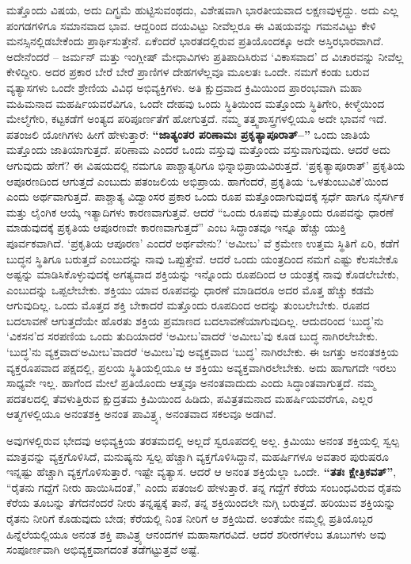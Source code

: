 ಮತ್ತೊಂದು ವಿಷಯ, ಅದು ದಿಗ್ಭ್ರಮೆ ಹುಟ್ಟಿಸುವಂಥದು, ವಿಶೇಷವಾಗಿ ಭಾರತೀಯವಾದ ಲಕ್ಷಣವುಳ್ಳದ್ದು. ಅದು ಎಲ್ಲ ಪಂಗಡಗಳಿಗೂ ಸಮಾನವಾದ ಭಾವ. ಆದ್ದರಿಂದ ದಯವಿಟ್ಟು ನೀವೆಲ್ಲರೂ ಈ ವಿಷಯವನ್ನು ಗಮನವಿಟ್ಟು ಕೇಳಿ ಮನಸ್ಸಿನಲ್ಲಿಡಬೇಕೆಂದು ಪ್ರಾರ್ಥಿಸುತ್ತೇನೆ. ಏಕೆಂದರೆ ಭಾರತದಲ್ಲಿರುವ ಪ್ರತಿಯೊಂದಕ್ಕೂ ಅದೇ ಅಸ್ತಿರಭಾರವಾಗಿದೆ. ಅದೇನೆಂದರೆ – ಜರ್ಮನ್​ ಮತ್ತು ಇಂಗ್ಲೀಷ್​ ಮೇಧಾವಿಗಳು ಪ್ರತಿಪಾದಿಸಿರುವ ‘ವಿಕಾಸವಾದ’ ದ ವಿಚಾರವನ್ನು ನೀವೆಲ್ಲ ಕೇಳಿದ್ದೀರಿ. ಅದರ ಪ್ರಕಾರ ಬೇರೆ ಬೇರೆ ಪ್ರಾಣಿಗಳ ದೇಹಗಳೆಲ್ಲವೂ ಮೂಲತಃ ಒಂದೇ. ನಮಗೆ ಕಂಡು ಬರುವ ವ್ಯತ್ಯಾಸಗಳು ಒಂದೇ ಶ್ರೇಣಿಯ ವಿವಿಧ ಅಭಿವ್ಯಕ್ತಿಗಳು. ಅತಿ ಕ್ಷುದ್ರವಾದ ಕ್ರಿಮಿಯಿಂದ ಪ್ರಾರಂಭವಾಗಿ ಮಹಾ ಮಹಿಮನಾದ ಮಹರ್ಷಿಯವರೆವಿಗೂ, ಒಂದೇ ದೇಹವು ಒಂದು ಸ್ಥಿತಿಯಿಂದ ಮತ್ತೊಂದು ಸ್ಥಿತಿಗೇರಿ, ಕೀಳ್ಮೆಯಿಂದ ಮೇಲ್ಮೆಗೇರಿ, ಕಟ್ಟಕಡೆಗೆ ಅಂತ್ಯದ ಪರಿಪೂರ್ಣತೆಗೆ ಹೋಗುತ್ತದೆ. ನಮ್ಮ ತತ್ತ್ವಶಾಸ್ತ್ರಗಳಲ್ಲಿಯೂ ಅದೇ ಭಾವನೆ ಇದೆ. ಪತಂಜಲಿ ಯೋಗಿಗಳು ಹೀಗೆ ಹೇಳುತ್ತಾರೆ: \textbf{“ಜಾತ್ಯಂತರ ಪರಿಣಾಮಃ ಪ್ರಕೃತ್ಯಾಪೂರಾತ್​–”} ಒಂದು ಜಾತಿಯೆ ಮತ್ತೊಂದು ಜಾತಿಯಾಗುತ್ತದೆ. ಪರಿಣಾಮ ಎಂದರೆ ಒಂದು ವಸ್ತುವು ಮತ್ತೊಂದು ವಸ್ತುವಾಗುವುದು. ಆದರೆ ಅದು ಆಗುವುದು ಹೇಗೆ? ಈ ವಿಷಯದಲ್ಲಿ ನಮಗೂ ಪಾಶ್ಚಾತ್ಯರಿಗೂ ಭಿನ್ನಾಭಿಪ್ರಾಯವಿರುತ್ತದೆ. ‘ಪ್ರಕೃತ್ಯಾಪೂರಾತ್​’ ಪ್ರಕೃತಿಯ ಆಪೂರಣದಿಂದ ಆಗುತ್ತದೆ ಎಂಬುದು ಪತಂಜಲಿಯ ಅಭಿಪ್ರಾಯ. ಹಾಗೆಂದರೆ, ಪ್ರಕೃತಿಯ ‘ಒಳತುಂಬುವಿಕೆ’ಯಿಂದ ಎಂದು ಅರ್ಥವಾಗುತ್ತದೆ. ಪಾಶ್ಚಾತ್ಯ ವಿದ್ವಾಂಸರ ಪ್ರಕಾರ ಒಂದು ರೂಪ ಮತ್ತೊಂದಾಗುವುದಕ್ಕೆ ಸ್ಫರ್ಧೆ ಹಾಗೂ ನೈಸರ್ಗಿಕ ಮತ್ತು ಲೈಂಗಿಕ ಆಯ್ಕೆ ಇತ್ಯಾದಿಗಳು  ಕಾರಣವಾಗುತ್ತವೆ. ಆದರೆ “ಒಂದು ರೂಪವು ಮತ್ತೊಂದು ರೂಪವನ್ನು ಧಾರಣೆ ಮಾಡುವುದಕ್ಕೆ ಪ್ರಕೃತಿಯ ಆಪೂರಣವೇ ಕಾರಣವಾಗುತ್ತದೆ” ಎಂಬ ಸಿದ್ಧಾಂತವೂ ಇನ್ನೂ ಹೆಚ್ಚು ಯುಕ್ತಿ ಪೂರ್ವಕವಾಗಿದೆ. ‘ಪ್ರಕೃತಿಯ ಆಪೂರಣ’ ಎಂದರೆ ಅರ್ಥವೇನು? ‘ಅಮೀಬ’ ವೆ  ಕ್ರಮೇಣ ಉತ್ತಮ ಸ್ಥಿತಿಗೆ ಏರಿ, ಕಡೆಗೆ ಬುದ್ಧನ ಸ್ಥಿತಿಗೂ ಬರುತ್ತದೆ ಎಂಬುದನ್ನು ನಾವು ಒಪ್ಪುತ್ತೇವೆ. ಆದರೆ ಒಂದು ಯಂತ್ರದಿಂದ ನಮಗೆ ಎಷ್ಟು ಕೆಲಸಬೇಕೊ ಅಷ್ಟನ್ನು ಮಾಡಿಸಿಕೊಳ್ಳುವುದಕ್ಕೆ ಅಗತ್ಯವಾದ ಶಕ್ತಿಯನ್ನು ಇನ್ನೊಂದು ರೂಪದಿಂದ ಆ ಯಂತ್ರಕ್ಕೆ ನಾವು ಕೊಡಲೇಬೇಕು, ಎಂಬುದನ್ನು ಒಪ್ಪಲೇಬೇಕು. ಶಕ್ತಿಯು ಯಾವ ರೂಪವನ್ನು ಧಾರಣೆ ಮಾಡಿದರೂ ಅದರ ಮೊತ್ತ ಹೆಚ್ಚು ಕಡಮೆ ಆಗುವುದಿಲ್ಲ. ಒಂದು ಮೊತ್ತದ ಶಕ್ತಿ ಬೇಕಾದರೆ ಮತ್ತೊಂದು ರೂಪದಿಂದ ಅದನ್ನು ತುಂಬಲೇಬೇಕು. ರೂಪದ ಬದಲಾವಣೆ ಆಗುತ್ತದೆಯೇ ಹೊರತು ಶಕ್ತಿಯ ಪ್ರಮಾಣದ ಬದಲಾವಣೆಯಾಗುವುದಿಲ್ಲ. ಆದುದರಿಂದ ‘ಬುದ್ಧ’ನು ‘ವಿಕಸನ’ದ ಸರಪಣಿಯ ಒಂದು ತುದಿಯಾದರೆ ‘ಅಮೀಬ’ವಾದರೆ ‘ಅಮೀಬ’ವು ಕೂಡ ಬುದ್ಧ ನಾಗಿರಲೇಬೇಕು. ‘ಬುದ್ಧ’ನು ವ್ಯಕ್ತವಾದ‘ಅಮೀಬ’ವಾದರೆ ‘ಅಮೀಬ’ವು ಅವ್ಯಕ್ತವಾದ ‘ಬುದ್ಧ’ ನಾಗಿರಬೇಕು. ಈ ಜಗತ್ತು ಅನಂತಶಕ್ತಿಯ ವ್ಯಕ್ತರೂಪವಾದ ಪಕ್ಷದಲ್ಲಿ, ಪ್ರಲಯ ಸ್ಥಿತಿಯಲ್ಲಿಯೂ ಆ ಶಕ್ತಿಯು ಅವ್ಯಕ್ತವಾಗಿರಲೇಬೇಕು. ಅದು ಹಾಗಾಗದೇ ಇರಲು ಸಾಧ್ಯವೇ ಇಲ್ಲ. ಹಾಗೆಂದ ಮೇಲೆ ಪ್ರತಿಯೊಂದು ಆತ್ಮವೂ ಅನಂತವಾದುದು ಎಂದು ಸಿದ್ಧಾಂತವಾಗುತ್ತದೆ. ನಮ್ಮ ಪದತಲದಲ್ಲಿ ತೆವಳುತ್ತಿರುವ ಕ್ಷುದ್ರತಮ ಕ್ರಿಮಿಯಿಂದ ಹಿಡಿದು, ಪವಿತ್ರತಮನಾದ ಮಹರ್ಷಿಯವರೆಗೂ, ಎಲ್ಲರ ಆತ್ಮಗಳಲ್ಲಿಯೂ ಅನಂತಶಕ್ತಿ ಅನಂತ ಪಾವಿತ್ರ್ಯ, ಅನಂತವಾದ ಸಕಲವೂ ಅಡಗಿವೆ. 

ಅವುಗಳಲ್ಲಿರುವ ಭೇದವು ಅಭಿವ್ಯಕ್ತಿಯ ತರತಮದಲ್ಲಿ ಅಲ್ಲದೆ ಸ್ವರೂಪದಲ್ಲಿ ಅಲ್ಲ. ಕ್ರಿಮಿಯು ಅನಂತ ಶಕ್ತಿಯಲ್ಲಿ ಸ್ವಲ್ಪ ಮಾತ್ರವನ್ನು ವ್ಯಕ್ತಗೊಳಿಸಿದೆ, ಮನುಷ್ಯನು ಸ್ವಲ್ಪ ಹೆಚ್ಚಾಗಿ ವ್ಯಕ್ತಗೊಳಿಸಿದ್ದಾನೆ, ಮಹರ್ಷಿಗಳೂ ಅವತಾರ ಪುರುಷರೂ ಇನ್ನಷ್ಟು ಹೆಚ್ಚಾಗಿ ವ್ಯಕ್ತಗೊಳಿಸುತ್ತಾರೆ. ಇಷ್ಟೇ ವ್ಯತ್ಯಾಸ. ಆದರೆ ಆ ಅನಂತ ಶಕ್ತಿಯೆಲ್ಲಾ ಒಂದೇ. \textbf{“ತತಃ ಕ್ಷೇತ್ರಿಕವತ್​”}, “ರೈತನು ಗದ್ದೆಗೆ ನೀರು ಹಾಯಿಸಿದಂತೆ,” ಎಂದು ಪತಂಜಲಿ ಹೇಳುತ್ತಾರೆ. ತನ್ನ ಗದ್ದೆಗೆ ಕೆರೆಯ ಸಂಬಂಧವಿರುವ ರೈತನು ಕೆರೆಯ ತೂಬನ್ನು ತೆಗೆದನೆಂದರೆ ನೀರು ತನ್ನಷ್ಟಕ್ಕೆ ತಾನೆ, ತನ್ನ ಶಕ್ತಿಯಿಂದಲೇ ನುಗ್ಗಿ ಬರುತ್ತದೆ. ಹರಿಯುವ ಶಕ್ತಿಯನ್ನು ರೈತನು ನೀರಿಗೆ ಕೊಡುವುದು ಬೇಡ; ಕೆರೆಯಲ್ಲಿ ನಿಂತ ನೀರಿಗೆ ಆ ಶಕ್ತಿಯಿದೆ. ಅಂತೆಯೇ ನಮ್ಮಲ್ಲಿ ಪ್ರತಿಯೊಬ್ಬರ ಹಿನ್ನೆಲೆಯಲ್ಲಿಯೂ ಅನಂತ ಶಕ್ತಿ ಪಾವಿತ್ರ್ಯ ಆನಂದಗಳ ಮಹಾಸಾಗರವಿದೆ. ಆದರೆ ಶರೀರಗಳೆಂಬ ತೂಬುಗಳು ಅವು ಸಂಪೂರ್ಣವಾಗಿ ಅಭಿವ್ಯಕ್ತವಾಗದಂತೆ ತಡೆಗಟ್ಟುತ್ತವೆ ಅಷ್ಟೆ. 

